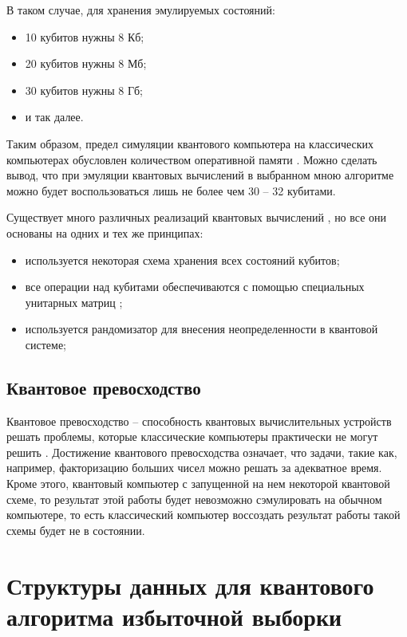 В таком случае, для хранения эмулируемых состояний:

\begin{itemize}
	\item 10 кубитов нужны 8 Кб;
	\item 20 кубитов нужны 8 Мб;
	\item 30 кубитов нужны 8 Гб;
	\item и так далее.
\end{itemize}

Таким образом, предел симуляции квантового компьютера на классических компьютерах обусловлен количеством оперативной памяти \cite{habr-quantum-computers}. Можно сделать вывод, что при эмуляции квантовых вычислений в выбранном мною алгоритме можно будет воспользоваться лишь не более чем 30 -- 32 кубитами.

Существует много различных реализаций квантовых вычислений \cite{habr-quantum-computers}, но все они основаны на одних и тех же принципах:

\begin{itemize}
	\item используется некоторая схема хранения всех состояний кубитов;
	\item все операции над кубитами обеспечиваются с помощью специальных унитарных матриц \cite{umatrix};
	\item используется рандомизатор для внесения неопределенности в квантовой системе;
\end{itemize}

\subsection{Квантовое превосходство}

Квантовое превосходство -- способность квантовых вычислительных устройств решать проблемы, которые классические компьютеры практически не могут решить \cite{quantum-supremacy}. Достижение квантового превосходства означает, что задачи, такие как, например, факторизацию больших чисел можно решать за адекватное время. Кроме этого, квантовый компьютер с запущенной на нем некоторой квантовой схеме, то результат этой работы будет невозможно сэмулировать на обычном компьютере, то есть классический компьютер воссоздать результат работы такой схемы будет не в состоянии.

\section{Структуры данных для квантового алгоритма избыточной выборки}


